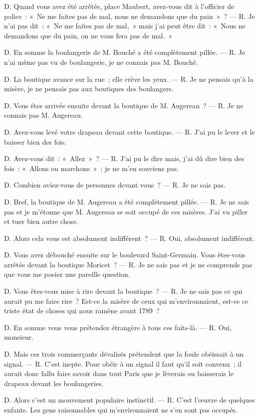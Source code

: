 \documentclass[french,twoside]{book} %
\begin{document}
D. Quand vous avez été arrêtée, place Maubert, avez-vous dit à l’officier de police : « Ne me faites pas de mal, nous ne  demandons que du pain » ? — R. Je n’ai pas dit : « Ne me faites pas de mal, » mais j’ai peut être dit : « Nous ne demandons que du pain, on ne vous fera pas de mal. »\par
D. En somme la boulangerie de M. Bouché a été complètement pillée. — R. Je n’ai même pas vu de boulangerie, je ne connais pas M. Bouché.\par
D. La boutique avance sur la rue ; elle crève les yeux. — R. Je ne pensais qu’à la misère, je ne pensais pas aux boutiques des boulangers.\par
D. Vous êtes arrivée ensuite devant la boutique de M. Augereau ? — R. Je ne connais pas M. Augereau.\par
D. Avez-vous levé votre drapeau devant cette boutique. — R. J’ai pu le lever et le baisser bien des fois.\par
D. Avez-vous dit : « Allez » ? — R. J’ai pu le dire mais, j’ai dû dire bien des fois : « Allons ou marchons » ; je ne m’en souviens pas.\par
D. Combien aviez-vous de personnes devant vous ? — R. Je ne sais pas.\par
D. Bref, la boutique de M. Augereau a été complètement pillée. — R. Je ne sais pas et je m’étonne que M. Augereau se soit occupé de ces misères. J’ai vu piller et tuer bien autre chose.\par
D. Alors cela vous est absolument indifférent ? — R. Oui, absolument indifférent.\par
D. Vous avez débouché ensuite sur le boulevard Saint-Germain. Vous êtes-vous arrêtée devant la boutique Moricet ? — R. Je ne sais pas et je ne comprends pas que vous me posiez une pareille question.\par
D. Vous êtes-vous mise à rire devant la boutique ? — R. Je ne sais pas ce qui aurait pu me faire rire ? Est-ce la misère de ceux qui m’environnaient, est-ce ce triste état de choses qui nous ramène avant 1789 ?\par
D. En somme vous vous prétendez étrangère à tous ces faits-là. — R. Oui, monsieur.\par
D. Mais ces trois commerçants dévalisés prétendent que la foule obéissait à un signal. — R. C’est inepte. Pour obéir à un signal il faut qu’il soit convenu ; il aurait donc fallu faire savoir dans tout Paris que je lèverais ou baisserais le drapeau devant les boulangeries.\par
D. Alors c’est un mouvement populaire instinctif. — R. C’est  l’œuvre de quelques enfants. Les gens raisonnables qui m’environnaient ne s’en sont pas occupés.\par
\end{document}
